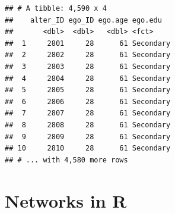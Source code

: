\documentclass[
]{book}
\begin{document}
\begin{verbatim}
## # A tibble: 4,590 x 4
##    alter_ID ego_ID ego.age ego.edu  
##       <dbl>  <dbl>   <dbl> <fct>    
##  1     2801     28      61 Secondary
##  2     2802     28      61 Secondary
##  3     2803     28      61 Secondary
##  4     2804     28      61 Secondary
##  5     2805     28      61 Secondary
##  6     2806     28      61 Secondary
##  7     2807     28      61 Secondary
##  8     2808     28      61 Secondary
##  9     2809     28      61 Secondary
## 10     2810     28      61 Secondary
## # ... with 4,580 more rows
\end{verbatim}

\hypertarget{networks-in-r}{%
\section{Networks in R}\label{networks-in-r}}
\end{document}
